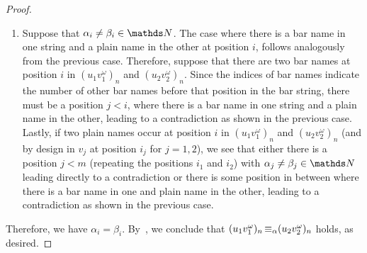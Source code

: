 \documentclass[a4paper,UKenglish,cleveref,autoref,thm-restate,numberwithinsect,final]{lipics-v2021}
\begin{document}
\begin{proof}
\begin{enumerate}
      \item Suppose that $\alpha_i \neq \beta_i \in \Nat$.
        The case where there is a bar name in one string and a plain name in the other at position $i$, follows
        analogously from the previous case. 
        Therefore, suppose that there are two bar names at position $i$ in $(u_1v_1^\omega)_n$ and $(u_2v_2^\omega)_n$.
        Since the indices of bar names indicate the number of other bar names before that position in the bar string,
        there must be a position $j < i$, where there is a bar name in one string and a plain name in the other,
        leading to a contradiction as shown in the previous case.
        Lastly, if two plain names occur at position $i$ in $(u_1v_1^\omega)_n$ and $(u_2v_2^\omega)_n$ (and by design
        in $v_j$ at position $i_j$ for $j = 1, 2$), we see that either there is a position $j < m$ (repeating the
        positions $i_1$ and $i_2$) with $\alpha_j \neq \beta_j \in \Nat$ leading directly to a contradiction or
        there is some position in between where there is a bar name in one and plain name in the other, leading to
        a contradiction as shown in the previous case. 
      \end{enumerate}
      Therefore, we have $\alpha_i = \beta_i$. By~, we conclude that $(u_1v_1^\omega)_n \operatorname{\equiv_{\alpha}} (u_2v_2^\omega)_n$ holds, as desired.
    \end{proof}
\end{document}
